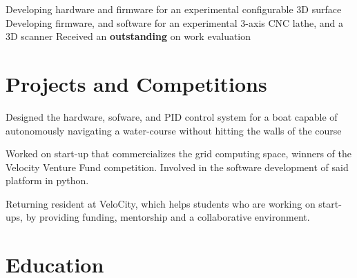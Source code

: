 \documentclass[11pt,a4paper]{moderncv}
\begin{document}
{Developing hardware and firmware for an experimental configurable 3D surface
    \newline{}Developing firmware, and software for an experimental 3-axis CNC lathe, and a 3D scanner
\newline{}Received an \textbf{outstanding} on work evaluation}

\section{Projects and Competitions}

{Designed the hardware, sofware, and PID control system for a boat capable of autonomously navigating a water-course without hitting the walls of the course}

{Worked on start-up that commercializes the grid computing space, winners of the Velocity Venture Fund competition.
\newline{}Involved in the software development of said platform in python.}

{Returning resident at VeloCity, which helps students who are working on start-ups, by providing funding, mentorship and a collaborative environment.}

\section{Education}
\end{document}
